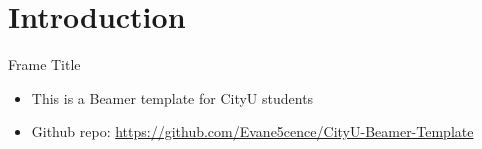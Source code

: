 \section{Introduction}

\begin{frame}{Frame Title}
    \begin{itemize}
        \item This is a Beamer template for CityU students
        \item Github repo: \newline 
        \small{\url{https://github.com/Evane5cence/CityU-Beamer-Template}}
    \end{itemize}
\end{frame}
